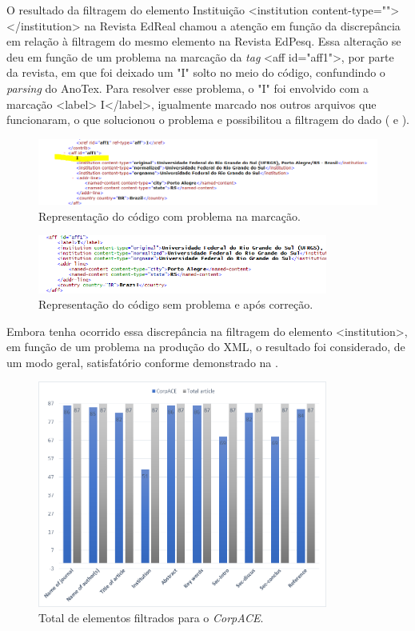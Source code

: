 \documentclass[portuguese]{textolivre}
\begin{document}
O resultado da filtragem do elemento Instituição <institution content-type=""> </institution> na Revista EdReal chamou a atenção em função da discrepância em relação à filtragem do mesmo elemento na Revista EdPesq. Essa alteração se deu em função de um problema na marcação da \textit{tag} <aff id="aff1">, por parte da revista, em que foi deixado um "I" solto no meio do código, confundindo o \textit{parsing} do AnoTex. Para resolver esse problema, o "I" foi envolvido com a marcação <label> I</label>, igualmente marcado nos outros arquivos que funcionaram, o que solucionou o problema e possibilitou a filtragem do dado ( e ).

\begin{figure}[htbp]
 \centering
 \includegraphics[width=\textwidth]{Fig7.png}
 \caption{Representação do código com problema na marcação.}
 \label{fig-07}
\end{figure}

\begin{figure}[htbp]
 \centering
 \includegraphics[width=0.85\textwidth]{Fig8.png}
 \caption{Representação do código sem problema e após correção.}
 \label{fig-08}
\end{figure}

Embora tenha ocorrido essa discrepância na filtragem do elemento <institution>, em função de um problema na produção do XML, o resultado foi considerado, de um modo geral, satisfatório conforme demonstrado na .

\begin{figure}[htbp]
 \centering
 \includegraphics[width=0.85\textwidth]{Fig9.png}
 \caption{Total de elementos filtrados para o \textit{CorpACE}.}
 \label{fig-09}
\end{figure}
\end{document}
